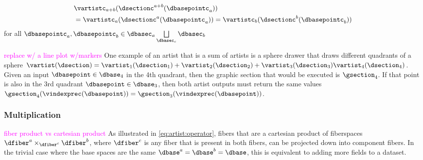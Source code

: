 \documentclass[10pt,journal,compsoc]{IEEEtran}
\newcommand{\note}[1]{\textcolor{magenta}{#1}}
\theoremstyle{definition}
\theoremstyle{remark}
\begin{document}
\begin{equation}
  \label{eq:artist:plus:verify}
  \begin{split}
  &\vartistc_{a+b}(\dsectionc^{a+b}(\dbasepointc_{a})) \\ 
  & = \vartistc_{a}(\dsectionc^{a}(\dbasepointc_{a})) = \vartistc_{b}(\dsectionc^{b}(\dbasepointc_{b}))
  \end{split}
\end{equation}
 for all $\dbasepointc_{a}, \dbasepointc_{b} \in \dbasec_{a}\bigsqcup\limits_{\dbasec_{c}} \dbasec_{b}$  
 
 \note{replace w/ a line plot w/markers}
 One example of an artist that is a sum of artists is a sphere drawer that draws different quadrants of a sphere $\vartist(\dsection) = \vartist_{1}(\dsection_{1}) + \vartist_{2}(\dsection_{2}) + \vartist_{3}(\dsection_{3}) \vartist_{4}(\dsection_{4})$. Given an input $\dbasepoint \in \dbase_4$ in the 4th quadrant, then the graphic section that would be executed is $\gsection_{4}$. If that point is also in the 3rd quadrant  $\dbasepoint \in \dbase_3$, then both artist outputs must return the same values $\gsection_{4}(\vindexprec(\dbasepoint)) = \gsection_{3}(\vindexprec(\dbasepoint))$. 


\subsubsection{Multiplication}
\label{sec:artist:operator:multiplication}
\note{fiber product vs cartesian product}
As illustrated in \autoref{eq:artist:operator},  fibers that are a cartesian product of fiberspaces $\dfiber^{a} \times_{\dfiber^c} \dfiber^{b}$, where $\dfiber^c$ is any fiber that is present in both fibers, can be projected down into component fibers. In the trivial case where the base spaces are the same $\dbase^{a} = \dbase^{b} = \dbase$, this is equivalent to adding more fields to a dataset. 
\end{document}
